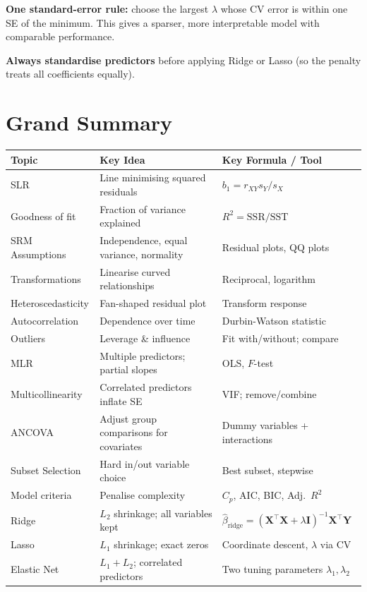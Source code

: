 \documentclass[12pt, a4paper]{article}
\begin{document}
\textbf{One standard-error rule:} choose the largest $\lambda$ whose CV error is within one SE of the minimum. This gives a sparser, more interpretable model with comparable performance.

\textbf{Always standardise predictors} before applying Ridge or Lasso (so the penalty treats all coefficients equally).

\section{Grand Summary}

\begin{center}
\renewcommand{\arraystretch}{1.4}
\begin{tabular}{p{3.5cm} p{4.5cm} p{4.5cm}}
\toprule
\textbf{Topic} & \textbf{Key Idea} & \textbf{Key Formula / Tool} \\
\midrule
SLR & Line minimising squared residuals & $b_1 = r_{XY}s_Y/s_X$ \\
Goodness of fit & Fraction of variance explained & $R^2 = \text{SSR}/\text{SST}$ \\
SRM Assumptions & Independence, equal variance, normality & Residual plots, QQ plots \\
Transformations & Linearise curved relationships & Reciprocal, logarithm \\
Heteroscedasticity & Fan-shaped residual plot & Transform response \\
Autocorrelation & Dependence over time & Durbin-Watson statistic \\
Outliers & Leverage \& influence & Fit with/without; compare \\
MLR & Multiple predictors; partial slopes & OLS, $F$-test \\
Multicollinearity & Correlated predictors inflate SE & VIF; remove/combine \\
ANCOVA & Adjust group comparisons for covariates & Dummy variables + interactions \\
Subset Selection & Hard in/out variable choice & Best subset, stepwise \\
Model criteria & Penalise complexity & $C_p$, AIC, BIC, Adj.\ $R^2$ \\
Ridge & $L_2$ shrinkage; all variables kept & $\hat{\beta}_\text{ridge} = (\mathbf{X}^\top\mathbf{X}+\lambda\mathbf{I})^{-1}\mathbf{X}^\top\mathbf{Y}$ \\
Lasso & $L_1$ shrinkage; exact zeros & Coordinate descent, $\lambda$ via CV \\
Elastic Net & $L_1 + L_2$; correlated predictors & Two tuning parameters $\lambda_1, \lambda_2$ \\
\bottomrule
\end{tabular}
\end{center}
\end{document}
